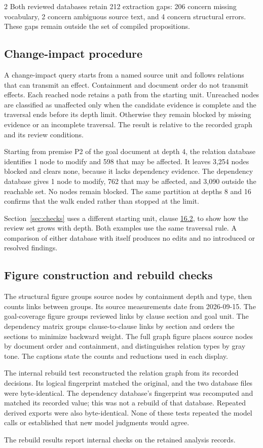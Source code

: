 \begin{multicols}{2}
Both reviewed databases retain 212 extraction gaps: 206 concern missing vocabulary, 2 concern ambiguous source text, and 4 concern structural errors. These gaps remain outside the set of compiled propositions.

\subsection{Change-impact procedure}

A change-impact query starts from a named source unit and follows relations that can transmit an effect. Containment and document order do not transmit effects. Each reached node retains a path from the starting unit. Unreached nodes are classified as unaffected only when the candidate evidence is complete and the traversal ends before its depth limit. Otherwise they remain blocked by missing evidence or an incomplete traversal. The result is relative to the recorded graph and its review conditions.

Starting from premise P2 of the goal document at depth 4, the relation database identifies 1 node to modify and 598 that may be affected. It leaves 3,254 nodes blocked and clears none, because it lacks dependency evidence. The dependency database gives 1 node to modify, 762 that may be affected, and 3,090 outside the reachable set. No nodes remain blocked. The same partition at depths 8 and 16 confirms that the walk ended rather than stopped at the limit.

Section~\ref{sec:checks} uses a different starting unit, clause \hyperlink{nss-16.2}{16.2}, to show how the review set grows with depth. Both examples use the same traversal rule. A comparison of either database with itself produces no edits and no introduced or resolved findings.

\subsection{Figure construction and rebuild checks}

The structural figure groups source nodes by containment depth and type, then counts links between groups. Its source measurements date from 2026-09-15. The goal-coverage figure groups reviewed links by clause section and goal unit. The dependency matrix groups clause-to-clause links by section and orders the sections to minimize backward weight. The full graph figure places source nodes by document order and containment, and distinguishes relation types by gray tone. The captions state the counts and reductions used in each display.

The internal rebuild test reconstructed the relation graph from its recorded decisions. Its logical fingerprint matched the original, and the two database files were byte-identical. The dependency database's fingerprint was recomputed and matched its recorded value; this was not a rebuild of that database. Repeated derived exports were also byte-identical. None of these tests repeated the model calls or established that new model judgments would agree.

The rebuild results report internal checks on the retained analysis records.
\end{multicols}
